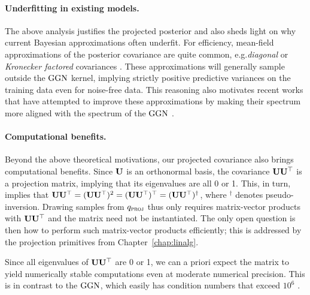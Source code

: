 \paragraph{Underfitting in existing models.}
The above analysis justifies the projected posterior and also sheds light on why current Bayesian approximations often underfit. For efficiency, mean-field approximations of the posterior covariance are quite common, e.g.\@ \emph{diagonal} or \emph{Kronecker factored} covariances \citep{ritter2018scalable, martens2015optimizing}. These approximations will generally sample outside the $\mathrm{GGN}$ kernel, implying strictly positive predictive variances on the training data even for noise-free data. This reasoning also motivates recent works that have attempted to improve these approximations by making their spectrum more aligned with the spectrum of the $\mathrm{GGN}$ \citep{george2018fast, dhahri2024shaving}.

\paragraph{Computational benefits.}
Beyond the above theoretical motivations, our projected covariance also brings computational benefits. Since $\mathbf{U}$ is an orthonormal basis, the covariance $\mathbf{U}\mathbf{U}^{\top}$ is a projection matrix, implying that its eigenvalues are all 0 or 1. This, in turn, implies that $\mathbf{U}\mathbf{U}^{\top} = (\mathbf{U}\mathbf{U}^{\top})^2 = (\mathbf{U}\mathbf{U}^{\top})^{\top} = (\mathbf{U}\mathbf{U}^{\top})^{\dagger}$, where $^{\dagger}$ denotes pseudo-inversion. Drawing samples from $q_{\textnormal{\textsc{proj}}}$ thus only requires matrix-vector products with $\mathbf{U}\mathbf{U}^{\top}$ and the matrix need not be instantiated.
The only open question is then how to perform such matrix-vector products efficiently; this is addressed by the projection primitives from Chapter~\ref{chap:linalg}. 

Since all eigenvalues of $\mathbf{U}\mathbf{U}^{\top}$ are 0 or 1, we can a priori expect the matrix to yield numerically stable computations even at moderate numerical precision. This is in contrast to the $\mathrm{GGN}$, which easily has condition numbers that exceed $10^6$ \citep{miani:sketching:2024}.


